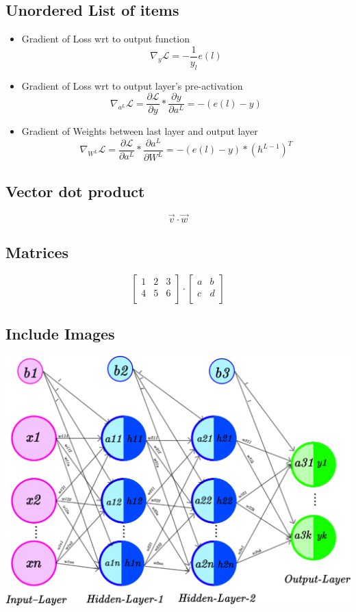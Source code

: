 \documentclass{article}
\begin{document}
\subsection{Unordered List of items}
\begin{itemize}


\item Gradient of Loss wrt to output function
$$\nabla_{y}\mathcal{L}=-\frac{1}{y_l}e(l)$$

\item Gradient of Loss wrt to output layer's pre-activation 
$$\nabla_{a^{L}}\mathcal{L}=\frac{\partial\mathcal{L}}{\partial{y}}*\frac{\partial y}{\partial{a^{L}}}=-(e(l)-y)$$

\item Gradient of Weights between last layer and output layer
$$\nabla_{W^{L}}\mathcal{L}=\frac{\partial\mathcal{L}}{\partial{a^{L}}}*\frac{\partial a^{L}}{\partial{W^{L}}}=-(e(l)-y)*(h^{L-1})^T$$

\end{itemize}

\subsection{Vector dot product}
$$\vec{v}\cdot\vec{w}$$

\subsection{Matrices}

$$
\begin{bmatrix}
1&2&3\\
4&5&6\\
\end{bmatrix}\cdot
\begin{bmatrix}
	a&b\\
	c&d\\
\end{bmatrix}
$$

\subsection{Include Images}
\includegraphics[scale=0.2]{ANN.png}

	
\end{document}
